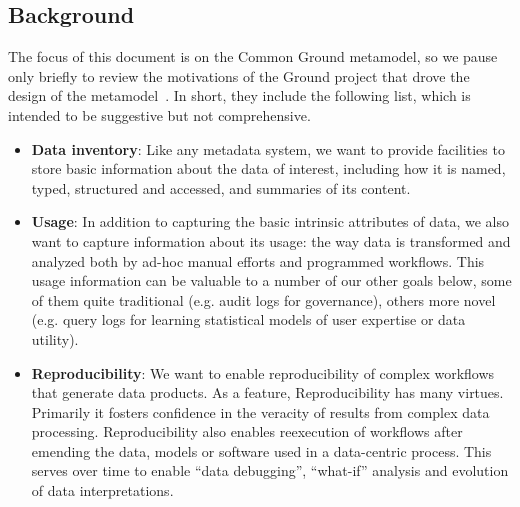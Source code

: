 \documentclass{article}
\begin{document}
\subsection{Background}
The focus of this document is on the Common Ground metamodel, so we pause only briefly to review the motivations of the Ground project that drove the design of the metamodel~\cite{StrataNYC15}.  In short, they include the following list, which is intended to be suggestive but not comprehensive.
\begin{itemize}
\item {\bf Data inventory}: Like any metadata system, we want to provide facilities to store basic information about the data of interest, including how it is named, typed, structured and accessed, 
and summaries of its content.

\item {\bf Usage}:
 In addition to capturing the basic intrinsic attributes of data, we also want to capture information about its usage: the way data is transformed and analyzed both by ad-hoc manual efforts and programmed workflows.  This usage information can be valuable to a number of our other goals below, some of them quite traditional (e.g. audit logs for governance), others more novel (e.g. query logs for learning statistical models of user expertise or data utility).

\item {\bf Reproducibility}:
We want to enable reproducibility of complex workflows that generate data products. As a feature, Reproducibility has many virtues.  Primarily it fosters confidence in the veracity of results from complex data processing.  Reproducibility also enables reexecution of workflows after emending the data, models or software used in a data-centric process.  This serves over time to enable ``data debugging'', ``what-if'' analysis and evolution of data interpretations.


\end{itemize}
\end{document}

